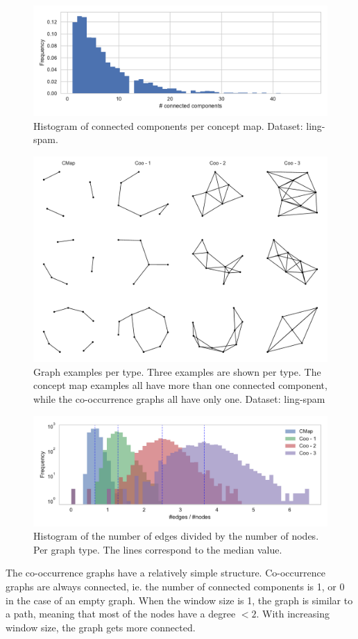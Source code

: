 \begin{figure}[ht]
\centering
\includegraphics[width=0.8\linewidth]{assets/figures/hist-connected-components-ling-spam-CMap.pdf}
\caption{Histogram of connected components per concept map. Dataset: ling-spam.}
\end{figure}

\begin{figure}[ht]
\centering
\includegraphics[width=0.6\linewidth]{assets/figures/graph-examples.pdf}
\caption{Graph examples per type. Three examples are shown per type. The concept map examples all have more than one connected component, while the co-occurrence graphs all have only one. Dataset: ling-spam}
\end{figure}

\begin{figure}[ht]
\centering
\includegraphics[width=0.7\linewidth]{assets/figures/hist-edgesnodes.pdf}
\caption{Histogram of the number of edges divided by the number of nodes. Per graph type. The lines correspond to the median value.}
\label{fig:histogram-edges-div-nodes-per-type}
\end{figure}

The co-occurrence graphs have a relatively simple structure.
Co-occurrence graphs are always connected, ie. the number of connected components is 1, or 0 in the case of an empty graph.
When the window size is 1, the graph is similar to a path, meaning that most of the nodes have a degree $< 2$. With increasing window size, the graph gets more connected.


